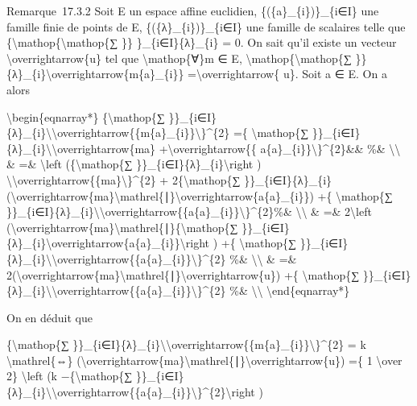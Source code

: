 \documentclass[]{article}
\begin{document}
Remarque~17.3.2 Soit E un espace affine euclidien,
\{(\{a\}\_\{i\})\}\_\{i∈I\} une famille finie de points de E,
\{(\{λ\}\_\{i\})\}\_\{i∈I\} une famille de scalaires telle que
\{\textbackslash{}mathop\{\textbackslash{}mathop\{∑ \}\}
\}\_\{i∈I\}\{λ\}\_\{i\} = 0. On sait qu'il existe un vecteur
\textbackslash{}overrightarrow\{u\} tel que \textbackslash{}mathop\{∀\}m
∈ E, \textbackslash{}mathop\{\textbackslash{}mathop\{∑ \}\}
\{λ\}\_\{i\}\textbackslash{}overrightarrow\{m\{a\}\_\{i\}\}
=\textbackslash{}overrightarrow\{ u\}. Soit a ∈ E. On a alors

\textbackslash{}begin\{eqnarray*\} \{\textbackslash{}mathop\{∑
\}\}\_\{i∈I\}\{λ\}\_\{i\}\textbackslash{}\textbar{}\textbackslash{}overrightarrow\{\{m\{a\}\_\{i\}\}\textbackslash{}\textbar{}\}\^{}\{2\}
=\{ \textbackslash{}mathop\{∑
\}\}\_\{i∈I\}\{λ\}\_\{i\}\textbackslash{}\textbar{}\textbackslash{}overrightarrow\{ma\}
+\textbackslash{}overrightarrow\{\{
a\{a\}\_\{i\}\}\textbackslash{}\textbar{}\}\^{}\{2\}\&\& \%\&
\textbackslash{}\textbackslash{} \& =\& \textbackslash{}left
(\{\textbackslash{}mathop\{∑
\}\}\_\{i∈I\}\{λ\}\_\{i\}\textbackslash{}right )
\textbackslash{}\textbar{}\textbackslash{}overrightarrow\{\{ma\}\textbackslash{}\textbar{}\}\^{}\{2\}
+ 2\{\textbackslash{}mathop\{∑
\}\}\_\{i∈I\}\{λ\}\_\{i\}(\textbackslash{}overrightarrow\{ma\}\textbackslash{}mathrel\{∣\}\textbackslash{}overrightarrow\{a\{a\}\_\{i\}\})
+\{ \textbackslash{}mathop\{∑
\}\}\_\{i∈I\}\{λ\}\_\{i\}\textbackslash{}\textbar{}\textbackslash{}overrightarrow\{\{a\{a\}\_\{i\}\}\textbackslash{}\textbar{}\}\^{}\{2\}\%\&
\textbackslash{}\textbackslash{} \& =\& 2\textbackslash{}left
(\textbackslash{}overrightarrow\{ma\}\textbackslash{}mathrel\{∣\}\{\textbackslash{}mathop\{∑
\}\}\_\{i∈I\}\{λ\}\_\{i\}\textbackslash{}overrightarrow\{a\{a\}\_\{i\}\}\textbackslash{}right
) +\{ \textbackslash{}mathop\{∑
\}\}\_\{i∈I\}\{λ\}\_\{i\}\textbackslash{}\textbar{}\textbackslash{}overrightarrow\{\{a\{a\}\_\{i\}\}\textbackslash{}\textbar{}\}\^{}\{2\}
\%\& \textbackslash{}\textbackslash{} \& =\&
2(\textbackslash{}overrightarrow\{ma\}\textbackslash{}mathrel\{∣\}\textbackslash{}overrightarrow\{u\})
+\{ \textbackslash{}mathop\{∑
\}\}\_\{i∈I\}\{λ\}\_\{i\}\textbackslash{}\textbar{}\textbackslash{}overrightarrow\{\{a\{a\}\_\{i\}\}\textbackslash{}\textbar{}\}\^{}\{2\}
\%\& \textbackslash{}\textbackslash{} \textbackslash{}end\{eqnarray*\}

On en déduit que

\{\textbackslash{}mathop\{∑
\}\}\_\{i∈I\}\{λ\}\_\{i\}\textbackslash{}\textbar{}\textbackslash{}overrightarrow\{\{m\{a\}\_\{i\}\}\textbackslash{}\textbar{}\}\^{}\{2\}
= k \textbackslash{}mathrel\{⇔\}
(\textbackslash{}overrightarrow\{ma\}\textbackslash{}mathrel\{∣\}\textbackslash{}overrightarrow\{u\})
=\{ 1 \textbackslash{}over 2\} \textbackslash{}left (k
−\{\textbackslash{}mathop\{∑
\}\}\_\{i∈I\}\{λ\}\_\{i\}\textbackslash{}\textbar{}\textbackslash{}overrightarrow\{\{a\{a\}\_\{i\}\}\textbackslash{}\textbar{}\}\^{}\{2\}\textbackslash{}right
)
\end{document}
